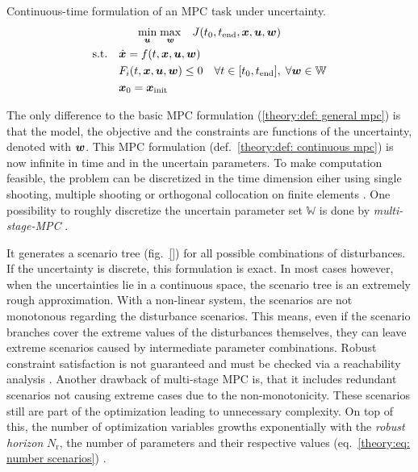 \begin{definition} Continuous-time formulation of an MPC task under uncertainty.
    \label{theory:def: continuous mpc}
    \[
        \begin{gathered}
            \underset{{\bm{u}}}{\min} \; \underset{{\bm{w}}}{\max} \quad  J(t_0, t_\text{end}, {\bm{x}}, {\bm{u}}, {\bm{w}}) \\
            \begin{aligned}
                \text{s.t.} \quad &\dot{{\bm{x}}} = f(t, {\bm{x}}, {\bm{u}}, {\bm{w}}) \\
                & F_i(t, {\bm{x}}, {\bm{u}}, {\bm{w}}) \leq 0 \quad \forall t \in [t_0, t_\text{end}], \; \forall {\bm{w}} \in \mathbb{W} \\
                & {\bm{x}}_0 = {\bm{x}}_\text{init}
            \end{aligned}
        \end{gathered}
    \]
\end{definition}

The only difference to the basic MPC formulation (\ref{theory:def: general mpc}) is that the model, the objective 
and the constraints are functions of the uncertainty, denoted with ${\bm{w}}$.
This MPC formulation (def.~\ref{theory:def: continuous mpc}) is now infinite in time and in the uncertain parameters.
To make computation feasible,
the problem can be discretized in the time dimension eiher using single shooting, multiple shooting or orthogonal collocation
on finite elements \cite{biegler2010}. One possibility to roughly discretize the uncertain parameter set $\mathbb{W}$ is
done by \emph{multi-stage-MPC} \cite{lucia2015}. 
\newline
\newline

It generates a scenario tree (fig.~\ref{}) for all 
possible combinations of disturbances. If the uncertainty is discrete, this formulation is exact.
In most cases however, when the uncertainties lie in a continuous space, the scenario tree
is an extremely rough approximation. With a non-linear system, the scenarios are not monotonous regarding the
disturbance scenarios. This means, even if the scenario branches cover the extreme values of the disturbances
themselves, they can leave extreme scenarios caused by intermediate parameter combinations. Robust 
constraint satisfaction is not guaranteed and must be checked via a reachability analysis \cite{lucia2015}.
Another drawback of multi-stage MPC is, that it includes redundant scenarios not causing extreme cases due to 
the non-monotonicity. These scenarios still are part of the optimization leading to unnecessary complexity.
On top of this, the number of optimization variables growths exponentially with the \emph{robust horizon} $N_\text{r}$,
the number of parameters and their respective values (eq.~\ref{theory:eq: number scenarios}) \cite{empty000}. 

